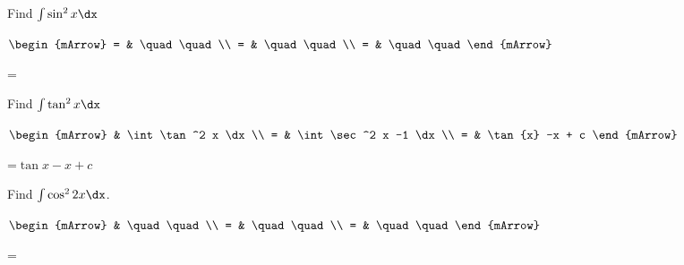 \begin{mtask}
   \task \begin{exercise} Find $\int \sin^2{x} \dx$
           \begin{envSolution}
             $\begin{mArrow}
                 = & \quad \quad              \\
		   		 = & \quad \quad              \\
				 = & \quad \quad 
              \end{mArrow}$
            \begin{shortsolution}  
			     =$ \quad \quad \quad \quad$
			\end{shortsolution}				 
           \end{envSolution}
         \end{exercise}

   \task \begin{exercise} Find $\int \tan^2 x \dx$
           \begin{envSolution}
             $\begin{mArrow}
                   & \int \tan^2 x     \dx             \\
		   		 = & \int \sec^2 x -1  \dx            \\
				 = & \tan{x} -x + c  
              \end{mArrow}$
            \begin{shortsolution}  
			     =$ \tan{x} -x + c$
			\end{shortsolution}				 
           \end{envSolution}
         \end{exercise}

   \task \begin{exercise} Find $\int \cos^{2}{2x} \dx$.
           \begin{envSolution}
             $\begin{mArrow}
                   & \quad \quad              \\
		   		 = & \quad \quad              \\
				 = & \quad \quad 
              \end{mArrow}$
            \begin{shortsolution}  
			     =$ \quad \quad \quad \quad$
			\end{shortsolution}				 
           \end{envSolution}
         \end{exercise}
		 

\end{mtask}
